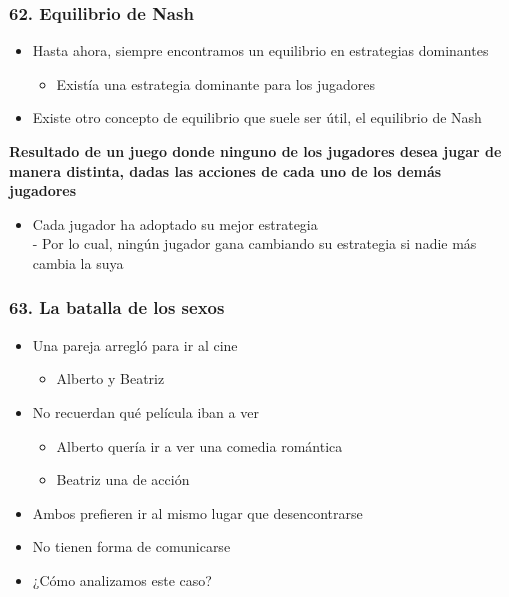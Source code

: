 \documentclass[14pt]{beamer}
\begin{document}
\begin{frame}
\frametitle{62. Equilibrio de Nash}
\begin{itemize}
        \item Hasta ahora, siempre encontramos un equilibrio en estrategias dominantes
        \begin{itemize}
            \item Existía una estrategia dominante para los jugadores
        \end{itemize}
        \item Existe otro concepto de equilibrio que suele ser útil, el equilibrio de Nash
        \end{itemize}
\textbf{Resultado de un juego donde ninguno de los jugadores desea jugar de manera distinta, dadas las acciones de cada uno de los demás jugadores} \vspace{2mm}
\begin{itemize}
        \begin{itemize}
            \item Cada jugador ha adoptado su mejor estrategia \\
            - Por lo cual, ningún jugador gana cambiando su estrategia si nadie más cambia la suya
        \end{itemize}
        \end{itemize}
\end{frame}

\begin{frame}
\frametitle{63. La batalla de los sexos}
\begin{itemize}
        \item Una pareja arregló para ir al cine
        \begin{itemize}
            \item Alberto y Beatriz
        \end{itemize}
        \item No recuerdan qué película iban a ver
        \begin{itemize}
            \item Alberto quería ir a ver una comedia romántica
            \item Beatriz una de acción
        \end{itemize}
        \item Ambos prefieren ir al mismo lugar que desencontrarse
        \item No tienen forma de comunicarse
        \item ¿Cómo analizamos este caso?
\end{itemize}
\end{frame}
\end{document}

